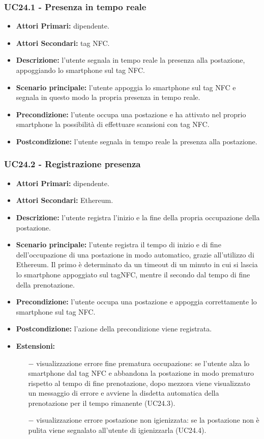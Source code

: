\subsubsection{ UC24.1 - Presenza in tempo reale}
\begin{itemize}
	\item\textbf{Attori Primari:} dipendente.
	\item\textbf{Attori Secondari:} tag NFC.
	\item\textbf{Descrizione:} l’utente segnala in tempo reale la presenza alla postazione, appoggiando lo smartphone sul tag NFC.
	\item\textbf{Scenario principale:} l’utente appoggia lo smartphone sul tag NFC e segnala in questo modo la propria presenza in tempo reale.
	\item\textbf{Precondizione:} l’utente occupa una postazione e ha attivato nel proprio smartphone la possibilità di effettuare scansioni con tag NFC.
	\item\textbf{Postcondizione:} l’utente segnala in tempo reale la presenza alla postazione.
\end{itemize}


\subsubsection{ UC24.2 - Registrazione presenza}
\begin{itemize}
	\item\textbf{Attori Primari:} dipendente.
	\item\textbf{Attori Secondari:} Ethereum.
	\item\textbf{Descrizione:} l’utente registra l'inizio e la fine della propria occupazione della postazione.
	\item\textbf{Scenario principale:} l'utente registra il tempo di inizio e di fine dell'occupazione di una postazione in modo automatico, grazie all'utilizzo di Ethereum. Il primo è determinato da un timeout di un minuto in cui si lascia lo smartphone appoggiato sul tagNFC, mentre il secondo dal tempo di fine della prenotazione.
	\item\textbf{Precondizione:} l’utente occupa una postazione e appoggia correttamente lo smartphone sul tag NFC. 
	\item\textbf{Postcondizione:} l'azione della precondizione viene registrata.
	\item\textbf{Estensioni:} 
	\begin{itemize}
		\item[$-$] visualizzazione errore fine prematura occupazione: se l'utente alza lo smartphone dal tag NFC e abbandona la postazione in modo prematuro rispetto al tempo di fine prenotazione, dopo mezzora viene visualizzato un messaggio di errore e avviene la disdetta automatica della prenotazione per il tempo rimanente (UC24.3).
	\end{itemize}
	\begin{itemize}
	\item[$-$] visualizzazione errore postazione non igienizzata: se la postazione non è pulita viene segnalato all'utente di igienizzarla (UC24.4).
	\end{itemize}
\end{itemize}


